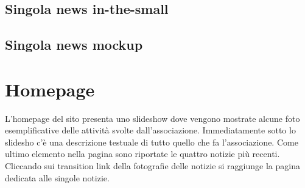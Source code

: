        \subsection{Singola news in-the-small}

        \subsection{Singola news mockup}

    \section{Homepage}
    L'homepage del sito presenta uno slideshow dove vengono mostrate alcune foto
    esemplificative delle attività svolte dall'associazione. Immediatamente
    sotto lo slidesho c'è una descrizione testuale di tutto quello che fa
    l'associazione. Come ultimo elemento nella pagina sono riportate le quattro
    notizie più recenti. Cliccando sui transition link della fotografie delle
    notizie si raggiunge la pagina dedicata alle singole notizie.


    
